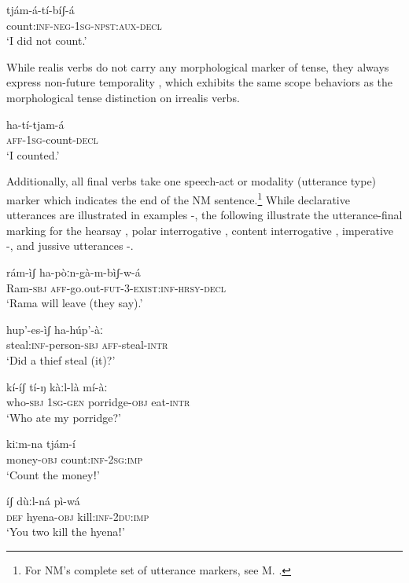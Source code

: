 \documentclass[output=paper]{langsci/langscibook}
\begin{document}
\ea\label{ex:mahland:7}
\gll tjám-á-tí-bíʃ-{\downstep}á\\
count:\textsc{inf-neg-1sg-npst:aux-decl} \\
\glt `I did not count.'
\z

While realis verbs do not carry any morphological marker of tense, they always express non-future temporality , which exhibits the same scope behaviors as the morphological tense distinction on irrealis verbs. 

\ea\label{ex:mahland:8}
\gll ha-tí-tjam-á\\
\textsc{aff-1sg}{}-count-\textsc{decl} \\
\glt `I counted.'
\z

Additionally, all final verbs take one speech-act or modality (utterance type) marker which indicates the end of the NM sentence.\footnote{For NM's complete set of utterance markers, see M. \citet[469]{Ahland2012}.} While declarative utterances are illustrated in examples -, the following illustrate the utterance-final marking for the hearsay , polar interrogative , content interrogative , imperative -, and jussive utterances -. 

\ea\label{ex:mahland:9}
\gll rám-ìʃ  ha-pòːn-gà-m-bìʃ-w-á        \\
Ram-\textsc{sbj} \textsc{aff}{}-go.out-\textsc{fut-3-exist:inf-hrsy-decl} \\
\glt `Rama will leave (they say).'
\z 

\ea\label{ex:mahland:10}
\gll hup'-es-ìʃ                 ha-húp'-àː     \\
steal:\textsc{inf}{}-person-\textsc{sbj}   \textsc{aff}{}-steal-\textsc{intr}\\
\glt `Did a thief steal (it)?'
\z

\ea\label{ex:mahland:11}
\gll kí-íʃ           tí-ŋ          kàːl-là            mí-àː   \\
who-\textsc{sbj}   1\textsc{sg-gen}   porridge-\textsc{obj} eat-\textsc{intr}\\
\glt `Who ate my porridge?'
\z

\ea\label{ex:mahland:12}
\gll kiːm-na       tjám-í   \\
money\textsc{{}-obj}   count:\textsc{inf-2sg:imp}\\
\glt `Count the moneyǃ'
\z

\ea\label{ex:mahland:13}
\gll íʃ     dùːl-ná       pì-wá \\
\textsc{def}   hyena-\textsc{obj}   kill:\textsc{inf-2du:imp}\\
\glt `You two kill the hyenaǃ'
\z
\end{document}
